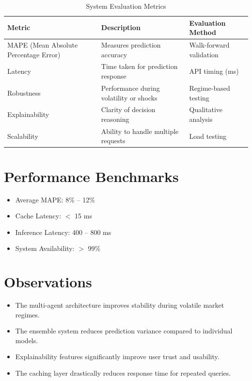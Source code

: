 \documentclass[12pt,a4paper]{report}
\begin{document}
\begin{table}[H]
\centering
\caption{System Evaluation Metrics}
\begin{tabular}{|p{4cm}|p{4cm}|p{3cm}|}
\hline
\textbf{Metric} & \textbf{Description} & \textbf{Evaluation Method} \\
\hline
MAPE (Mean Absolute Percentage Error) & Measures prediction accuracy & Walk-forward validation \\
\hline
Latency & Time taken for prediction response & API timing (ms) \\
\hline
Robustness & Performance during volatility or shocks & Regime-based testing \\
\hline
Explainability & Clarity of decision reasoning & Qualitative analysis \\
\hline
Scalability & Ability to handle multiple requests & Load testing \\
\hline
\end{tabular}
\end{table}

\section{Performance Benchmarks}

\begin{itemize}
    \item Average MAPE: 8\% -- 12\%
    \item Cache Latency: $<$ 15 ms
    \item Inference Latency: 400 -- 800 ms
    \item System Availability: $>$ 99\%
\end{itemize}

\section{Observations}

\begin{itemize}
    \item The multi-agent architecture improves stability during volatile market regimes.
    \item The ensemble system reduces prediction variance compared to individual models.
    \item Explainability features significantly improve user trust and usability.
    \item The caching layer drastically reduces response time for repeated queries.
\end{itemize}
\end{document}
